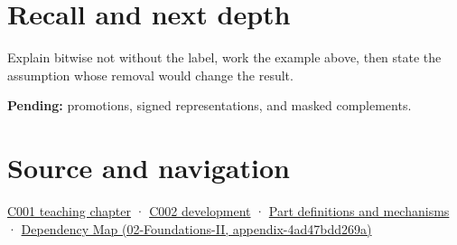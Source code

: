 \section{Recall and next depth}\label{appendix-8f38927cfc54-recall-and-next-depth}

Explain bitwise not without the label, work the example above, then state the assumption whose removal would change the result.

\textbf{Pending:} promotions, signed representations, and masked complements.

\section{Source and navigation}\label{appendix-8f38927cfc54-source-and-navigation}

\href{Continuous\%20Notes/Computing\%20Foundations\%20-\%20From\%20Bits\%20to\%20C++\%20and\%20Systems\%20APIs\#From\%20a\%20signal\%20to\%20an\%20interpretation}{C001 teaching chapter} · \href{Continuous\%20Notes/Computing\%20Foundations\%20-\%20From\%20Bits\%20to\%20C++\%20and\%20Systems\%20APIs\#Arithmetic\%20becomes\%20a\%20policy}{C002 development} · \hyperref[appendix-fd090d982a15]{Part definitions and mechanisms} · \href{../02-Foundations-II/main.pdf\#nameddest=appendix-4ad47bdd269a}{Dependency Map (02-Foundations-II, appendix-4ad47bdd269a)}
